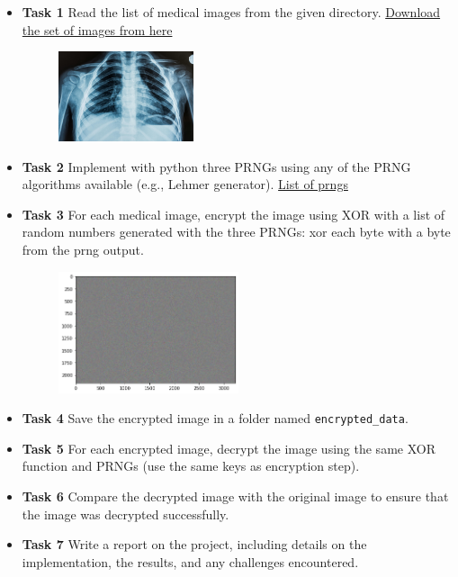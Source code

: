 \begin{itemize}
\item
  \textbf{Task 1} Read the list of medical images from the given directory. \href{https://ydjemmada.github.io/projects/proj2_images.rar}{Download the set of images from here}
  \begin{figure}[H]
    \centering
    \includegraphics[width=150px]{med_1.jpg} 
  \end{figure}
  \item
  \textbf{Task 2} Implement with python three PRNGs using any of the PRNG algorithms
  available (e.g., Lehmer generator).
  \href{https://en.wikipedia.org/wiki/List_of_random_number_generators}{List
  of prngs}
\item
  \textbf{Task 3} For each medical image, encrypt the image using XOR with a list of random numbers generated with the three PRNGs: xor each byte with a byte from the prng output.
  \begin{figure}[H]\centering
    \includegraphics[width=200px]{enc_med_1.png} 
  \end{figure}
\item
  \textbf{Task 4} Save the encrypted image in a folder named \verb|encrypted_data|.
\item
  \textbf{Task 5} For each encrypted image, decrypt the image using the same XOR function and PRNGs (use the same keys as encryption step).
\item
  \textbf{Task 6} Compare the decrypted image with the original image to ensure that the image was decrypted successfully.
\item
  \textbf{Task 7} Write a report on the project, including details on the implementation, the results, and any challenges encountered.
\end{itemize}
\newpage